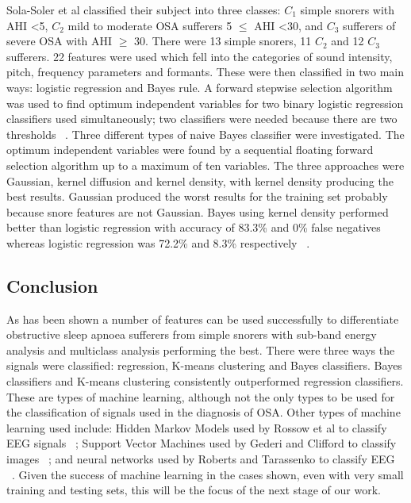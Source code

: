 Sola-Soler et al classified their subject into three classes: $C_{1}$ simple snorers with AHI \textless 5, $C_{2}$ mild to moderate OSA sufferers 5 $\leq$ AHI \textless 30, and $C_{3}$ sufferers of severe OSA with AHI $\geq$ 30. There were 13 simple snorers, 11 $C_{2}$ and 12 $C_{3}$ sufferers. 22 features were used which fell into the categories of sound intensity, pitch, frequency parameters and formants. These were then classified in two main ways: logistic regression and Bayes rule. A forward stepwise selection algorithm was used to find optimum independent variables for two binary logistic regression classifiers used simultaneously; two classifiers were needed because there are two thresholds ~\cite{sola2012multiclass}.
Three different types of naive Bayes classifier were investigated. The optimum independent variables were found by a sequential floating forward selection algorithm up to a maximum of ten variables. The three approaches were Gaussian, kernel diffusion and kernel density, with kernel density producing the best results. Gaussian produced the worst results for the training set probably because snore features are not Gaussian. Bayes using kernel density performed better than logistic regression with accuracy of 83.3\% and 0\% false negatives whereas logistic regression was 72.2\% and 8.3\% respectively ~\cite{sola2012multiclass}.
\subsection{Conclusion}
As has been shown a number of features can be used successfully to differentiate obstructive sleep apnoea sufferers from simple snorers with sub-band energy analysis and multiclass analysis performing the best. There were three ways the signals were classified: regression, K-means clustering and Bayes classifiers. Bayes classifiers and K-means clustering consistently outperformed regression classifiers. These are types of machine learning, although not the only types to be used for the classification of signals used in the diagnosis of OSA. Other types of machine learning used include: Hidden Markov Models used by Rossow et al to classify EEG signals ~\cite{rossow2011automatic}; Support Vector Machines used by Gederi and Clifford to classify images ~\cite{gederi2012fusion}; and neural networks used by Roberts and Tarassenko to classify EEG ~\cite{roberts1992new}. Given the success of machine learning in the cases shown, even with very small training and testing sets, this will be the focus of the next stage of our work. 

